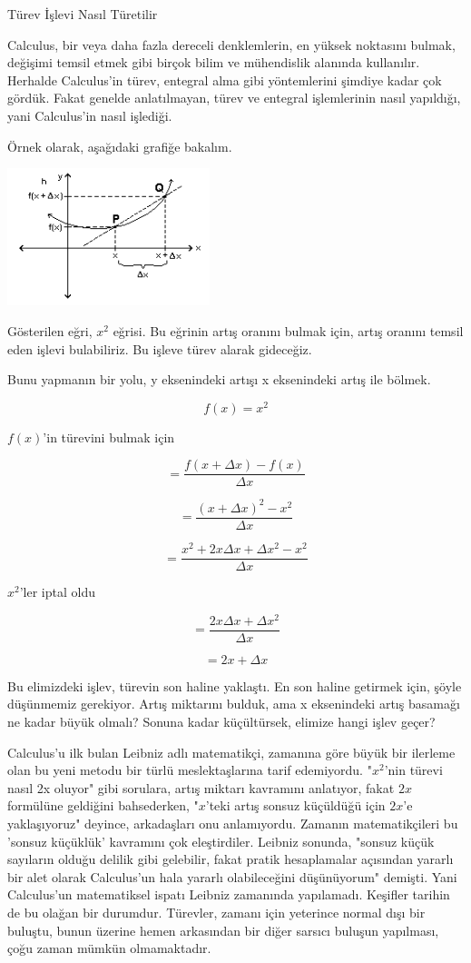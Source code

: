 \documentclass[12pt,fleqn]{article}\usepackage{../../common}
\begin{document}
Türev İşlevi Nasıl Türetilir

Calculus, bir veya daha fazla dereceli denklemlerin, en yüksek noktasını
bulmak, değişimi temsil etmek gibi birçok bilim ve mühendislik alanında
kullanılır. Herhalde Calculus'in türev, entegral alma gibi yöntemlerini
şimdiye kadar çok gördük. Fakat genelde anlatılmayan, türev ve entegral
işlemlerinin nasıl yapıldığı, yani Calculus'in nasıl işlediği.

Örnek olarak, aşağıdaki grafiğe bakalım. 

\includegraphics[height=4cm]{calc_multi_app_10.png}

Gösterilen eğri, $x^2$ eğrisi. Bu eğrinin artış oranını bulmak için, artış
oranını temsil eden işlevi bulabiliriz. Bu işleve türev alarak gideceğiz.

Bunu yapmanın bir yolu, y eksenindeki artışı x eksenindeki artış ile
bölmek. 

$$ f(x) = x^2 $$

$f(x)$'in türevini bulmak için 

$$ = \frac{f(x+\Delta x) - f(x)}{\Delta x} $$

$$ = \frac{(x+\Delta x)^2 - x^2}{\Delta x} $$

$$ = \frac{x^2 + 2x\Delta x + \Delta x^2 - x^2}{\Delta x} $$

$x^2$'ler iptal oldu

$$=  \frac{2x\Delta x + \Delta x^2}{\Delta x} $$


$$ = 2x + \Delta x $$

Bu elimizdeki işlev, türevin son haline yaklaştı. En son haline getirmek
için, şöyle düşünmemiz gerekiyor. Artış miktarını bulduk, ama x eksenindeki
artış basamağı ne kadar büyük olmalı? Sonuna kadar küçültürsek, elimize
hangi işlev geçer?

Calculus'u ilk bulan Leibniz adlı matematikçi, zamanına göre büyük bir
ilerleme olan bu yeni metodu bir türlü meslektaşlarına tarif
edemiyordu. "$x^2$'nin türevi nasıl 2x oluyor" gibi sorulara, artış miktarı
kavramını anlatıyor, fakat $2x$ formülüne geldiğini bahsederken, "$x$'teki
artış sonsuz küçüldüğü için $2x$'e yaklaşıyoruz" deyince, arkadaşları onu
anlamıyordu. Zamanın matematikçileri bu 'sonsuz küçüklük' kavramını çok
eleştirdiler. Leibniz sonunda, "sonsuz küçük sayıların olduğu delilik gibi
gelebilir, fakat pratik hesaplamalar açısından yararlı bir alet olarak
Calculus'un hala yararlı olabileceğini düşünüyorum" demişti. Yani
Calculus'un matematiksel ispatı Leibniz zamanında yapılamadı. Keşifler
tarihin de bu olağan bir durumdur. Türevler, zamanı için yeterince normal
dışı bir buluştu, bunun üzerine hemen arkasından bir diğer sarsıcı buluşun
yapılması, çoğu zaman mümkün olmamaktadır.
\end{document}
